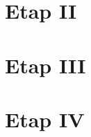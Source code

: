 \documentclass{article}\usepackage[]{graphicx}\usepackage[]{color}
\begin{document}
\section{Etap II}


\section{Etap III}


\section{Etap IV}
\end{document}
